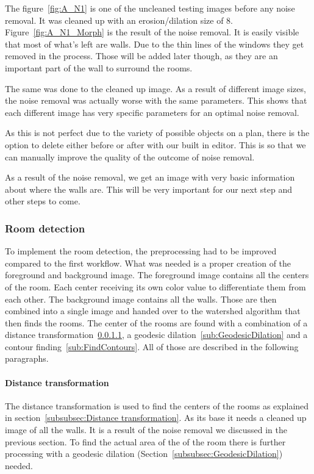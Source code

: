 The figure~\ref{fig:A_N1} is one of the uncleaned testing images before any noise removal. It was cleaned up with an erosion/dilation size of 8. Figure~\ref{fig:A_N1_Morph} is the result of the noise removal. It is easily visible that most of what's left are walls. Due to the thin lines of the windows they get removed in the process. Those will be added later though, as they are an important part of the wall to surround the rooms.

The same was done to the cleaned up image. As a result of different image sizes, the noise removal was actually worse with the same parameters. This shows that each different image has very specific parameters for an optimal noise removal.

As this is not perfect due to the variety of possible objects on a plan, there is the option to delete either before or after with our built in editor. This is so that we can manually improve the quality of the outcome of noise removal.

As a result of the noise removal, we get an image with very basic information about where the walls are. This will be very important for our next step and other steps to come.


\subsubsection{Room detection}
To implement the room detection, the preprocessing had to be improved compared to the first workflow. What was needed is a proper creation of the foreground and background image. The foreground image contains all the centers of the room. Each center receiving its own color value to differentiate them from each other. The background image contains all the walls. Those are then combined into a single image and handed over to the watershed algorithm that then finds the rooms. The center of the rooms are found with a combination of a distance transformation~\ref{sub:DistanceTransformation}, a geodesic dilation~\ref{sub:GeodesicDilation} and a contour finding~\ref{sub:FindContours}. All of those are described in the following paragraphs.

\paragraph{Distance transformation}
\label{sub:DistanceTransformation}
The distance transformation is used to find the centers of the rooms as explained in section~\ref{subsubsec:Distance transformation}. As its base it needs a cleaned up image of all the walls. It is a result of the noise removal we discussed in the previous section. To find the actual area of the of the room there is further processing with a geodesic dilation (Section~\ref{subsubsec:GeodesicDilation}) needed.

